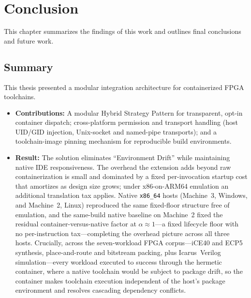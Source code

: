 
\chapter{Conclusion}
\label{ch:conclusion}
This chapter summarizes the findings of this work and outlines final conclusions and future work.

\section{Summary}
This thesis presented a modular integration architecture for containerized FPGA toolchains.
\begin{itemize}
    \item \textbf{Contributions:} A modular Hybrid Strategy Pattern for transparent, opt-in container dispatch; cross-platform permission and transport handling (host UID/GID injection, Unix-socket and named-pipe transports); and a toolchain-image pinning mechanism for reproducible build environments.
    \item \textbf{Result:} The solution eliminates ``Environment Drift'' while maintaining native IDE responsiveness. The overhead the extension adds beyond raw containerization is small and dominated by a fixed per-invocation startup cost that amortizes as design size grows; under x86-on-ARM64 emulation an additional translation tax applies. Native \texttt{x86\_64} hosts (Machine~3, Windows, and Machine~2, Linux) reproduced the same fixed-floor structure free of emulation, and the same-build native baseline on Machine~2 fixed the residual container-versus-native factor at $\alpha \approx 1$---a fixed lifecycle floor with no per-instruction tax---completing the overhead picture across all three hosts. Crucially, across the seven-workload FPGA corpus---iCE40 and ECP5 synthesis, place-and-route and bitstream packing, plus Icarus~Verilog simulation---every workload executed to success through the hermetic container, where a native toolchain would be subject to package drift, so the container makes toolchain execution independent of the host's package environment and resolves cascading dependency conflicts.
\end{itemize}

